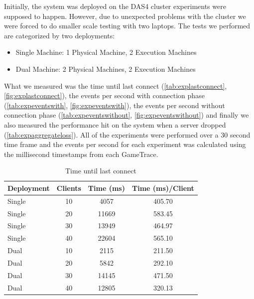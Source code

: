 \documentclass[a4paper,10pt]{article}
\begin{document}
Initially, the system was deployed on the DAS4 cluster experiments were supposed to happen.
However, due to unexpected problems with the cluster we were forced to do smaller scale testing with two laptops.
The tests we performed are categorized by two deployments: 

\begin{itemize}
\item Single Machine: 1 Physical Machine, 2 Execution Machines
\item Dual Machine: 2 Physical Machines, 2 Execution Machines
\end{itemize}

What we measured was the time until last connect (\autoref{tab:explastconnect}, \autoref{fig:explastconnect}),
the events per second with connection phase (\autoref{tab:expeventswith}, \autoref{fig:expeventswith}),
the events per second without connection phase (\autoref{tab:expeventswithout}, \autoref{fig:expeventswithout}) and 
finally we also measured the performance hit on the system when a server dropped (\autoref{tab:expaggregateloss}).
All of the experiments were performed over a 30 second time frame and the events per second for each experiment was calculated 
using the millisecond timestamps from each GameTrace.

\begin{table}
\centering
\begin{tabular}{| l | c | c | c |}
\hline
\textbf{Deployment} & \textbf{Clients} & \textbf{Time (ms)}  & \textbf{Time (ms)/Client} \\
\hline
\hline
Single & 10 & 4057 & 405.70\\
\hline
Single & 20 & 11669 &583.45 \\
\hline
Single & 30& 13949 & 464.97\\
\hline
Single & 40& 22604 & 565.10\\
\hline
\hline
Dual & 10 & 2115 &211.50 \\
\hline
Dual & 20 & 5842 &292.10 \\
\hline
Dual & 30 & 14145 &471.50 \\
\hline
Dual & 40 & 12805 &320.13 \\
\hline
\end{tabular}
\caption{Time until last connect}
\label{tab:explastconnect}
\end{table}
\end{document}
